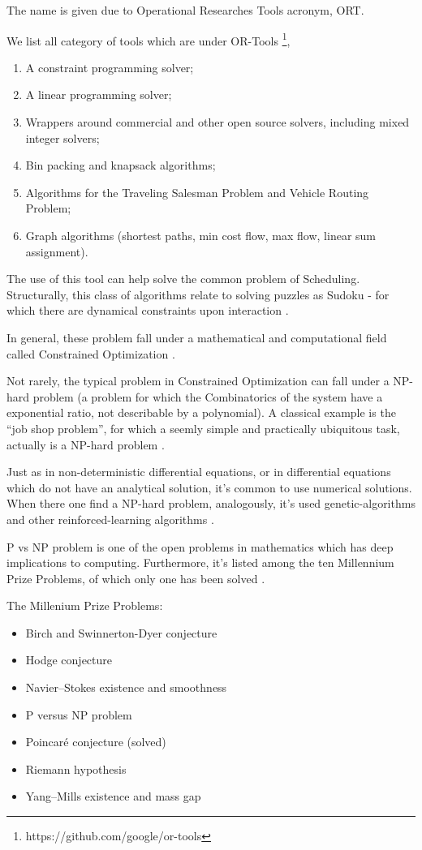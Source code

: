 \documentclass[
12pt,				%
openright,			%
oneside,			%
a4paper,			%
brazil,				%
english,			%
]{abntex2}
\begin{document}
The name is given due to Operational Researches Tools acronym, ORT.

We list all category of tools which are under OR-Tools \footnote{https://github.com/google/or-tools},

\begin{enumerate}
\item A constraint programming solver;
\item A linear programming solver;
\item  Wrappers around commercial and other open source solvers, including mixed integer solvers;
\item  Bin packing and knapsack algorithms;
\item  Algorithms for the Traveling Salesman Problem and Vehicle Routing Problem;
\item  Graph algorithms (shortest paths, min cost flow, max flow, linear sum assignment).
\end{enumerate}


The use of this tool can help solve the common problem of
Scheduling. Structurally, this class of algorithms relate to solving
puzzles as Sudoku - for which there are dynamical constraints upon
interaction \cite{simonis2005sudoku}. 

In general, these problem fall under a mathematical and computational
field called Constrained Optimization \cite{bertsekas2014constrained}. 

Not rarely, the typical problem in Constrained Optimization can fall
under a NP-hard problem (a problem for which the Combinatorics of the
system have a exponential ratio, not describable by a polynomial). A
classical example is the ``job shop problem'', for which a seemly
simple and practically ubiquitous task, actually is a NP-hard problem \cite{zhang2019review}.   

Just as in non-deterministic differential equations, or in
differential equations which do not have an analytical solution, it's
common to use numerical solutions. When there one find a NP-hard
problem, analogously, it's used genetic-algorithms and other
reinforced-learning algorithms \cite{zhang2019review}.  

P vs NP problem is one of the open problems in mathematics which has
deep implications to computing. Furthermore, it's listed among the ten
Millennium Prize Problems, of which only one has been solved \cite{cook2006p}.

The Millenium Prize Problems:

\begin{itemize}
  \item Birch and Swinnerton-Dyer conjecture
  \item Hodge conjecture
  \item Navier–Stokes existence and smoothness
  \item P versus NP problem
  \item Poincaré conjecture (solved)
  \item Riemann hypothesis
  \item Yang–Mills existence and mass gap
\end{itemize}
\end{document}
